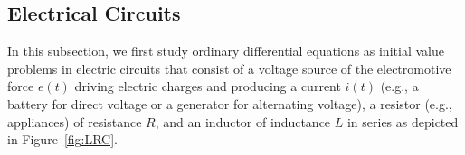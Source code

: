 	\subsection{Electrical Circuits}\label{subsec:electric-circuits}


In this subsection, we first study  ordinary differential equations  as initial value problems  in electric circuits  that consist of a voltage source  of the electromotive force $e(t)$  driving electric charges  and producing a current $i(t)$ (e.g., a battery  for direct voltage or a generator for alternating voltage), a resistor (e.g., appliances) of resistance $R$, and an inductor of inductance $L$ in series as depicted in Figure~\ref{fig:LRC}.

